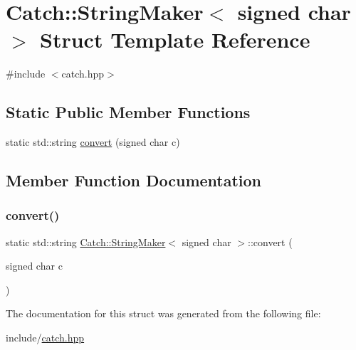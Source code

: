 \hypertarget{struct_catch_1_1_string_maker_3_01signed_01char_01_4}{}\section{Catch\+::String\+Maker$<$ signed char $>$ Struct Template Reference}
\label{struct_catch_1_1_string_maker_3_01signed_01char_01_4}


{\ttfamily \#include $<$catch.\+hpp$>$}

\subsection*{Static Public Member Functions}
\begin{DoxyCompactItemize}
\item 
static std\+::string \mbox{\hyperlink{struct_catch_1_1_string_maker_3_01signed_01char_01_4_a5ec41f32916539dc90130539db8222cf}{convert}} (signed char c)
\end{DoxyCompactItemize}


\subsection{Member Function Documentation}
\mbox{\label{struct_catch_1_1_string_maker_3_01signed_01char_01_4_a5ec41f32916539dc90130539db8222cf}} 
\subsubsection{\texorpdfstring{convert()}{convert()}}
{\footnotesize\ttfamily static std\+::string \mbox{\hyperlink{struct_catch_1_1_string_maker}{Catch\+::\+String\+Maker}}$<$ signed char $>$\+::convert (\begin{DoxyParamCaption}\item[{signed char}]{c }\end{DoxyParamCaption})\hspace{0.3cm}{\ttfamily [static]}}



The documentation for this struct was generated from the following file\+:\begin{DoxyCompactItemize}
\item 
include/\mbox{\hyperlink{catch_8hpp}{catch.\+hpp}}\end{DoxyCompactItemize}
